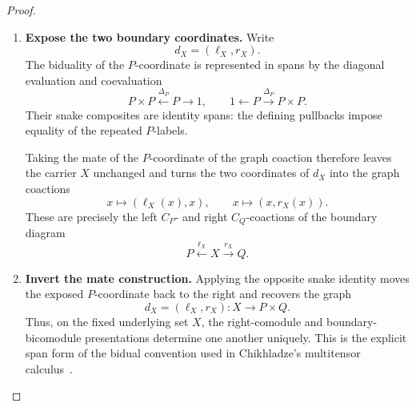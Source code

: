 \documentclass[oneside]{article}
\theoremstyle{plain}
\theoremstyle{definition}
\theoremstyle{remark}
\begin{document}
\begin{proof}
\begin{enumerate}[beginpenalty=10000]
        \item \textbf{Expose the two boundary coordinates.} Write
        \[
            d_X=(\ell_X,r_X).
        \]
        The biduality of the \(P\)-coordinate is represented in spans by the diagonal evaluation and coevaluation
        \[
            P\times P
            \xleftarrow{\Delta_P}
            P
            \longrightarrow
            1,
            \qquad
            1
            \longleftarrow
            P
            \xrightarrow{\Delta_P}
            P\times P.
        \]
        Their snake composites are identity spans: the defining pullbacks impose equality of the repeated \(P\)-labels.

        Taking the mate of the \(P\)-coordinate of the graph coaction therefore leaves the carrier \(X\) unchanged and turns the two coordinates of \(d_X\) into the graph coactions
        \[
            x\longmapsto(\ell_X(x),x),
            \qquad
            x\longmapsto(x,r_X(x)).
        \]
        These are precisely the left \(C_P\)- and right \(C_Q\)-coactions of the boundary diagram
        \[
            P\xleftarrow{\ell_X}X\xrightarrow{r_X}Q.
        \]

        \item \textbf{Invert the mate construction.} Applying the opposite snake identity moves the exposed \(P\)-coordinate back to the right and recovers the graph
        \[
            d_X=(\ell_X,r_X):
            X\longrightarrow P\times Q.
        \]
        Thus, on the fixed underlying set \(X\), the right-comodule and boundary-bicomodule presentations determine one another uniquely. This is the explicit span form of the bidual convention used in Chikhladze's multitensor calculus~\cite[\S3]{Chikhladze2010QuantumModules}. \qedhere
    \end{enumerate}
\end{proof}
\end{document}
